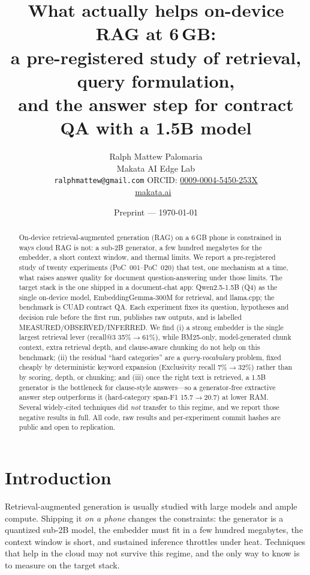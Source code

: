 \documentclass[11pt]{article}
\title{\textbf{What actually helps on-device RAG at 6\,GB:\\
a pre-registered study of retrieval, query formulation,\\
and the answer step for contract QA with a 1.5B model}}
\author{Ralph Mattew Palomaria\\
  Makata AI Edge Lab\\
  \texttt{ralphmattew@gmail.com} \quad ORCID: \href{https://orcid.org/0009-0004-5450-253X}{0009-0004-5450-253X}\\
  \small\href{https://makata.ai}{makata.ai} \,\textbar\, \repo}
\date{Preprint --- \today}
\newcommand{\poc}[1]{PoC~#1}
\begin{document}
\maketitle

\begin{abstract}
On-device retrieval-augmented generation (RAG) on a 6\,GB phone is constrained in ways
cloud RAG is not: a sub-2B generator, a few hundred megabytes for the embedder, a short
context window, and thermal limits. We report a pre-registered study of twenty experiments
(\poc{001}--\poc{020}) that test, one mechanism at a time, what raises answer quality for
document question-answering under those limits. The target stack is the one shipped in a
document-chat app: Qwen2.5-1.5B (Q4) as the single on-device model, EmbeddingGemma-300M for
retrieval, and llama.cpp; the benchmark is CUAD contract QA. Each experiment fixes its
question, hypotheses and decision rule before the first run, publishes raw outputs, and is
labelled MEASURED/OBSERVED/INFERRED. We find (i) a strong embedder is the single largest
retrieval lever (recall@3 35\%$\rightarrow$61\%), while BM25-only, model-generated chunk
context, extra retrieval depth, and clause-aware chunking do not help on this benchmark;
(ii) the residual ``hard categories'' are a \emph{query-vocabulary} problem, fixed cheaply by
deterministic keyword expansion (Exclusivity recall 7\%$\rightarrow$32\%) rather than by
scoring, depth, or chunking; and (iii) once the right text is retrieved, a 1.5B generator is
the bottleneck for clause-style answers---so a generator-free extractive answer step
outperforms it (hard-category span-F1 15.7$\rightarrow$20.7) at lower RAM. Several widely-cited
techniques did \emph{not} transfer to this regime, and we report those negative results in
full. All code, raw results and per-experiment commit hashes are public and open to
replication.
\end{abstract}

\section{Introduction}
Retrieval-augmented generation is usually studied with large models and ample compute.
Shipping it \emph{on a phone} changes the constraints: the generator is a quantized sub-2B
model, the embedder must fit in a few hundred megabytes, the context window is short, and
sustained inference throttles under heat. Techniques that help in the cloud may not survive
this regime, and the only way to know is to measure on the target stack.
\end{document}
